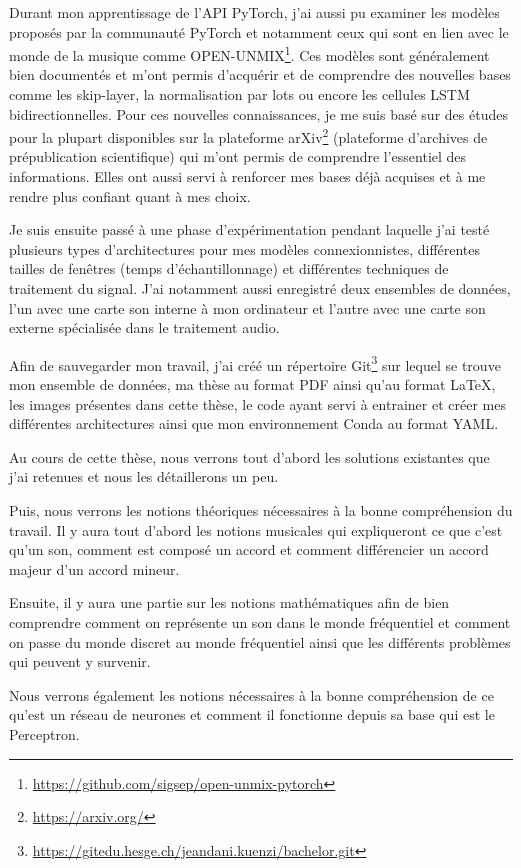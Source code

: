 Durant mon apprentissage de l'API PyTorch, j'ai aussi pu examiner les modèles proposés par la communauté PyTorch et notamment ceux qui sont en lien avec le monde de la musique comme OPEN-UNMIX\footnote{\url{https://github.com/sigsep/open-unmix-pytorch}}. Ces modèles sont généralement bien documentés et m'ont permis d'acquérir et de comprendre des nouvelles bases comme les skip-layer, la normalisation par lots ou encore les cellules LSTM bidirectionnelles. Pour ces nouvelles connaissances, je me suis basé sur des études pour la plupart disponibles sur la plateforme arXiv\footnote{\url{https://arxiv.org/}} (plateforme d'archives de prépublication scientifique) qui m'ont permis de comprendre l'essentiel des informations. Elles ont aussi servi à renforcer mes bases déjà acquises et à me rendre plus confiant quant à mes choix.

Je suis ensuite passé à une phase d'expérimentation pendant laquelle j'ai testé plusieurs types d'architectures pour mes modèles connexionnistes, différentes tailles de fenêtres (temps d'échantillonnage) et différentes techniques de traitement du signal. J'ai notamment aussi enregistré deux ensembles de données, l'un avec une carte son interne à mon ordinateur et l'autre avec une carte son externe spécialisée dans le traitement audio.

Afin de sauvegarder mon travail, j'ai créé un répertoire Git\footnote{\url{https://gitedu.hesge.ch/jeandani.kuenzi/bachelor.git}} sur lequel se trouve mon ensemble de données, ma thèse au format PDF ainsi qu'au format LaTeX, les images présentes dans cette thèse, le code ayant servi à entrainer et créer mes différentes architectures ainsi que mon environnement Conda au format YAML.

Au cours de cette thèse, nous verrons tout d'abord les solutions existantes que j'ai retenues et nous les détaillerons un peu.

Puis, nous verrons les notions théoriques nécessaires à la bonne compréhension du travail. Il y aura tout d'abord les notions musicales qui expliqueront ce que c'est qu'un son, comment est composé un accord et comment différencier un accord majeur d'un accord mineur.

Ensuite, il y aura une partie sur les notions mathématiques afin de bien comprendre comment on représente un son dans le monde fréquentiel et comment on passe du monde discret au monde fréquentiel ainsi que les différents problèmes qui peuvent y survenir.

Nous verrons également les notions nécessaires à la bonne compréhension de ce qu'est un réseau de neurones et comment il fonctionne depuis sa base qui est le Perceptron.

